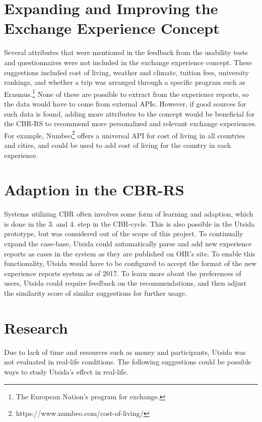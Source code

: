 \section{Expanding and Improving the Exchange Experience Concept}

Several attributes that were mentioned in the feedback from the usability tests and questionnaires were not included in the exchange experience concept. These suggestions included cost of living, weather and climate, tuition fees, university rankings, and whether a trip was arranged through a specific program such as Erasmus.\footnote{The European Nation's program for exchange.} None of these are possible to extract from the experience reports, so the data would have to come from external APIs. However, if good sources for such data is found, adding more attributes to the concept would be beneficial for the CBR-RS to recommend more personalized and relevant exchange experiences. For example, Numbeo\footnote{https://www.numbeo.com/cost-of-living/} offers a universal API for cost of living in all countries and cities, and could be used to add cost of living for the country in each experience. 

\section{Adaption in the CBR-RS}

Systems utilizing CBR often involves some form of learning and adaption, which is done in the 3. and 4. step in the CBR-cycle. This is also possible in the Utsida prototype, but was considered out of the scope of this project. To continually expand the case-base, Utsida could automatically parse and add new experience reports as cases in the system as they are published on OIR's site. To enable this functionality, Utsida would have to be configured to accept the format of the new experience reports system as of 2017. To learn more about the preferences of users, Utsida could require feedback on the recommendations, and then adjust the similarity score of similar suggestions for further usage.

\section{Research}

Due to lack of time and resources such as money and participants, Utsida was not evaluated in real-life conditions. The following suggestions could be possible ways to study Utsida's effect in real-life.

